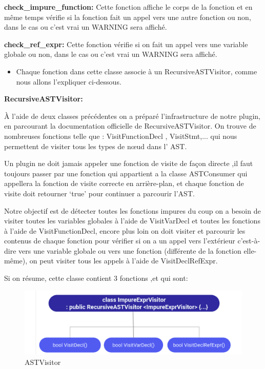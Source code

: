 \documentclass[12pt,a4paper]{article}
\begin{document}
\textbf{check\_impure\_function:}
 Cette fonction affiche le corps de la fonction et en même temps vérifie si la fonction fait un appel vers une autre fonction ou non, dans le cas ou c’est vrai un WARNING sera affiché. 

\textbf{check\_ref\_expr:}	
 Cette fonction vérifie si on fait un appel vers une variable globale ou non, dans le cas ou c’est vrai un WARNING sera affiché. 
\begin{itemize}
\item Chaque fonction dans cette classe associe à un RecursiveASTVisitor, comme nous allons l’expliquer ci-dessous.
\end{itemize}

\textbf{RecursiveASTVisitor:}

À l’aide de deux classes précédentes on a préparé l’infrastructure de notre plugin,  en parcourant  la documentation officielle de RecursiveASTVisitor. On trouve de nombreuses fonctions  telle que :  VisitFunctionDecl , VisitStmt,... qui nous  permettent de visiter tous les types de nœud dans l’ AST.

Un plugin ne doit jamais appeler une fonction de visite de façon directe ,il faut toujours passer par une fonction qui appartient a  la classe ASTConsumer qui appellera la fonction de visite correcte en arrière-plan, et chaque fonction de visite doit retourner ‘true’ pour continuer a parcourir l’AST. 

Notre objectif est de détecter toutes les fonctions impures du coup on a besoin de visiter toutes les variables globales à l’aide  de  VisitVarDecl et toutes les fonctions à l’aide de VisitFunctionDecl, encore plus loin on doit visiter et parcourir les contenus de chaque fonction pour vérifier si on a un appel vers l’extérieur c’est-à-dire vers une variable globale ou vers une fonction (différente de la fonction elle-même), on peut visiter tous les appels à l’aide de VisitDeclRefExpr.

Si on résume, cette  classe contient 3 fonctions ,et qui sont: 
\begin{figure}[H]
\centering
\includegraphics[scale=0.75]{vis-1.png} 
\caption[ASTVisitor]{ASTVisitor} 
\end{figure} 
\end{document}
